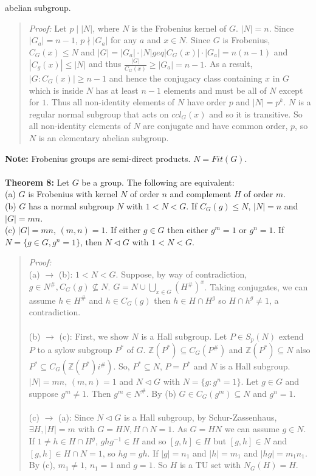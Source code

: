 abelian subgroup.
\begin{quote}
\emph{Proof:} Let $p \mid |N|$, where $N$ is the Frobenius kernel of $G$. $|N|= n$.  Since $|G_a| = n-1$, $p \nmid |G_a|$ for any $a$
and $x \in N$.  Since $G$ is Frobenius, $C_G(x) \leq N$ and $|G| = |G_a| \cdot |N| geq |C_G(x)| \cdot |G_a| = n (n-1)$ and
$|C_g(x)| \leq |N|$ and thus ${\frac {|G|} {C_G(x)}} \geq |G_a| = n-1$.  As a result, $|G:C_G(x)| \geq n-1$ and hence the conjugacy class
containing $x$ in $G$ which is inside $N$ has at least $n-1$ elements and must be all of $N$ except for $1$.  Thus all non-identity
elements of $N$ have order $p$ and $|N|=p^k$.  $N$ is a regular normal subgroup that acts on $ccl_G(x)$ and so it is transitive.
So all non-identity elements of $N$ are conjugate and have common order, $p$, so $N$ is an elementary abelian subgroup.
\end{quote}
{\bf Note:} Frobenius groups are semi-direct products.  $N = Fit(G)$.
\\
\\
{\bf Theorem 8:} 
Let $G$ be a group.  The following are equivalent:\\
(a) $G$ is Frobenius with kernel $N$ of order $n$ and complement $H$ of order $m$.
\\
(b) $G$ has a normal subgroup $N$ with $1 < N < G$.  If $C_G(g) \leq N$, $|N|=n$ and $|G| = mn$.
\\
(c) $|G|=mn$, $(m, n) = 1$.  If either $g \in G$ then either $g^m = 1$ or $g^n = 1$.  If $N = \{g \in G, g^n = 1 \}$,
then $N \lhd G$ with $1 < N < G$.
\begin{quote}
\emph{Proof:}
\\
(a) $\rightarrow$ (b):
$1 < N < G$.  Suppose, by way of contradiction, $g \in N^{\#}, C_G(g) \nsubseteq N$.
$G = N \cup \bigcup_{x \in G} (H^{\#})^x$.  Taking conjugates, we can assume $h \in H^{\#}$
and $h \in C_G(g)$ then $h \in H \cap H^g$ so $H \cap h^g \ne 1$, a contradiction.
\\
\\
(b) $\rightarrow$ (c):
First, we show $N$ is a Hall subgroup.  Let $P \in S_p(N)$ extend $P$ to a sylow subgroup $P^*$ of $G$.
$ {\mathbb Z}(P^*) \subseteq C_G(P^{\#})$ and ${\mathbb Z}(P^*) \subseteq N$ also $P^* \subseteq C_G({\mathbb Z}(P^*)i^{\#})$.
So, $P^* \subseteq N$, $P = P^*$ and $N$ is a Hall subgroup.
$|N|=mn$, $(m, n) =1$ and $N \lhd G$ with $N = \{g: g^n = 1 \}$.  Let $g \in G$ and suppose $g^m \ne 1$.  Then
$g^m \in N^{\#}$. By (b) $G \in C_G(g^m) \subseteq N$ and $g^n = 1$.
\\
\\
(c) $\rightarrow$ (a):
Since $N \lhd G$ is a Hall subgroup, by Schur-Zassenhaus, $\exists H, |H|=m$ with $G = HN, H \cap N = 1$.
As $G=HN$ we can assume $g \in N$. If $1 \ne h \in H \cap H^g$, $ghg^{-1} \in H$ and so $[g, h] \in H$ but
$[g, h] \in N$ and $[g, h] \in H \cap N = 1$, so $hg = gh$.  If $|g|= n_1$ and $|h|=m_1$ and $|hg|=m_1 n_1$.
By (c), $m_1 \ne 1$, $n_1 =1$ and $g=1$.  So $H$ is a TU set with $N_G(H)=H$.
\end{quote}
